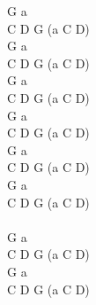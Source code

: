 \documentclass[a5paper, 10pt]{book}
\begin{document}
\begin{minipage}[t]{0.3\textwidth}
G a\\
C D G (a C D) \\
G a\\
C D G (a C D) \\

G a\\
C D G (a C D) \\
G a\\
C D G (a C D) \\

G a\\
C D G (a C D) \\
G a\\
C D G (a C D) \\  

~\\

G a\\
C D G (a C D) \\
G a\\
C D G (a C D) \\  

\end{minipage}

\newpage
\end{document}
